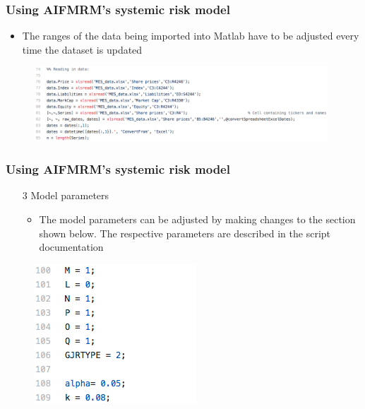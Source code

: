 \documentclass[11pt]{beamer}
\begin{document}

\begin{frame}
\frametitle{Using AIFMRM's systemic risk model}
\begin{itemize}
\item The ranges of the data being imported into Matlab have to be adjusted every time the dataset is updated
\end{itemize}
\begin{figure}
\centering
\includegraphics[width=110mm]{srisk2.png}
\end{figure}
\end{frame}


\begin{frame}
\frametitle{Using AIFMRM's systemic risk model}
\begin{enumerate}
\item[3] Model parameters
\begin{itemize}
\item The model parameters can be adjusted by making changes to the section shown below. The respective parameters are described in the script documentation
\end{itemize}
\end{enumerate}
\begin{figure}
\centering
\includegraphics[width=2.in]{srisk3.png}
\end{figure}
\end{frame}

\end{document}
